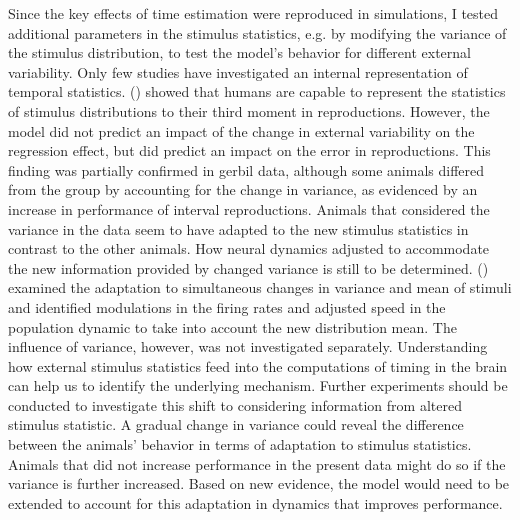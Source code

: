 \documentclass[10pt, a4paper]{article}
\begin{document}
Since the key effects of time estimation were reproduced in simulations, I tested additional parameters in the stimulus statistics, e.g. by modifying the variance of the stimulus distribution, to test the model's behavior for different external variability.
Only few studies have investigated an internal representation of temporal statistics. \citeauthor{Acerbi2012} (\citeyear{Acerbi2012}) showed that humans are capable to represent the statistics of stimulus distributions to their third moment in reproductions.  
However, the model did not predict an impact of the change in external variability on the regression effect, but did predict an impact on the error in reproductions.
This finding was partially confirmed in gerbil data, although some animals differed from the group by accounting for the change in variance, as evidenced by an increase in performance of interval reproductions.
Animals that considered the variance in the data seem to have adapted to the new stimulus statistics in contrast to the other animals. 
How neural dynamics adjusted to accommodate the new information provided by changed variance is still to be determined.
\citeauthor{Meirhaeghe2021} (\citeyear{Meirhaeghe2021}) examined the adaptation to simultaneous changes in variance and mean of stimuli and identified modulations in the firing rates and adjusted speed in the population dynamic to take into account the new distribution mean. The influence of variance, however, was not investigated separately. 
Understanding how external stimulus statistics feed into the computations of timing in the brain can help us to identify the underlying mechanism. 
Further experiments should be conducted to investigate this shift to considering information from altered stimulus statistic. 
A gradual change in variance could reveal the difference between the animals' behavior in terms of adaptation to stimulus statistics.
Animals that did not increase performance in the present data might do so if the variance is further increased.
Based on new evidence, the model would need to be extended to account for this adaptation in dynamics that improves performance.
\end{document}
